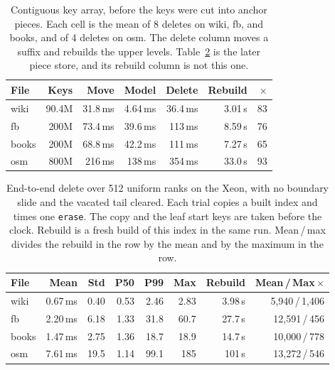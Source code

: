 \documentclass[conference]{IEEEtran}
\begin{document}
\begin{table}[t]
\caption{Contiguous key array, before the keys were cut into anchor pieces.
Each cell is the mean of 8 deletes on wiki, fb, and books, and of 4 deletes on osm.
The delete column moves a suffix and rebuilds the upper levels.
Table~\ref{tab:dist} is the later piece store, and its rebuild column is not this one.}
\label{tab:sosd}
\centering
\footnotesize
\begin{tabular}{@{}lrrrrrr@{}}
\toprule
File & Keys & Move & Model & Delete & Rebuild & $\times$ \\
\midrule
wiki  & 90.4M & 31.8\,ms & 4.64\,ms & 36.4\,ms & 3.01\,s & 83 \\
fb    & 200M  & 73.4\,ms & 39.6\,ms & 113\,ms & 8.59\,s & 76 \\
books & 200M  & 68.8\,ms & 42.2\,ms & 111\,ms & 7.27\,s & 65 \\
osm   & 800M  & 216\,ms & 138\,ms & 354\,ms & 33.0\,s & 93 \\
\bottomrule
\end{tabular}
\end{table}

\begin{table}[t]
\caption{End-to-end delete over 512 uniform ranks on the Xeon, with no boundary slide and the vacated tail cleared.
Each trial copies a built index and times one \texttt{erase}.
The copy and the leaf start keys are taken before the clock.
Rebuild is a fresh build of this index in the same run.
Mean\,/\,max divides the rebuild in the row by the mean and by the maximum in the row.}
\label{tab:dist}
\centering
\scriptsize
\begin{tabular}{@{}lrrrrrrr@{}}
\toprule
File & Mean & Std & P50 & P99 & Max & Rebuild & Mean\,/\,Max\,$\times$ \\
\midrule
wiki  & 0.67\,ms & 0.40 & 0.53 & 2.46 & 2.83 & 3.98\,s & 5{,}940\,/\,1{,}406 \\
fb    & 2.20\,ms & 6.18 & 1.33 & 31.8 & 60.7 & 27.7\,s & 12{,}591\,/\,456 \\
books & 1.47\,ms & 2.75 & 1.36 & 18.7 & 18.9 & 14.7\,s & 10{,}000\,/\,778 \\
osm   & 7.61\,ms & 19.5 & 1.14 & 99.1 & 185 & 101\,s & 13{,}272\,/\,546 \\
\bottomrule
\end{tabular}
\end{table}
\end{document}
